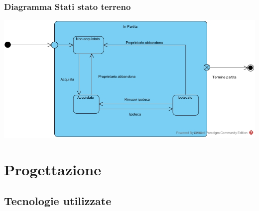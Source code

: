 \documentclass{article}
\begin{document}
\subsubsection{Diagramma Stati stato terreno}
\includegraphics[width=\textwidth]{DiagrammaStatiStatoTerreno}



\section{Progettazione}

\subsection{Tecnologie utilizzate}
\end{document}
